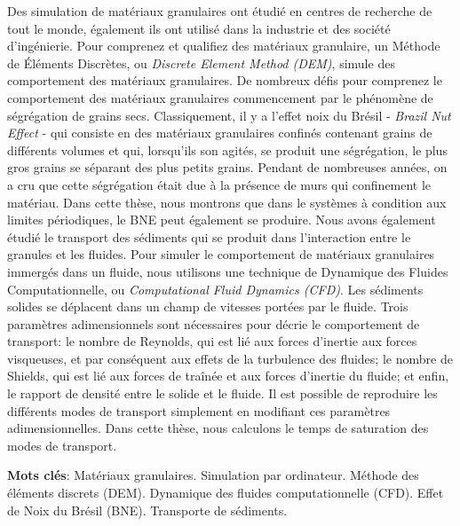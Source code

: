 
\begin{resumo}[Résumé]
    Des simulation de matériaux granulaires ont étudié en centres de recherche de tout le monde, également ils ont utilisé dans la industrie et des société d'ingénierie. Pour comprenez et qualifiez des matériaux granulaire, un Méthode de Éléments Discrètes, ou \textit{Discrete Element Method (DEM)}, simule des comportement des matériaux granulaires.
    De nombreux défis pour comprenez le comportement des matériaux granulaires commencement par le phénomène de ségrégation de grains secs. Classiquement, il y a l'effet noix du Brésil - \textit{Brazil Nut Effect} - qui consiste en des matériaux granulaires confinés contenant grains de différents volumes et qui, lorsqu'ils son agités, se produit une ségrégation, le plus gros grains se séparant des plus petits grains. Pendant de nombreuses années, on a cru que cette ségrégation était due à la présence de murs qui confinement le matériau. Dans cette thèse, nous montrons que dans le systèmes à condition aux limites périodiques, le BNE peut également se produire.
    Nous avons également étudié le transport des sédiments qui se produit dans l'interaction entre le granules et les fluides. Pour simuler le comportement de matériaux granulaires immergés dans un fluide, nous utilisons une technique de Dynamique des Fluides Computationnelle, ou \textit{Computational Fluid Dynamics (CFD)}. Les sédiments solides se déplacent dans un champ de vitesses portées par le fluide. Trois paramètres adimensionnels sont nécessaires pour décrie le comportement de transport: le nombre de Reynolds, qui est lié aux forces d'inertie aux forces visqueuses, et par conséquent aux effets de la turbulence des fluides; le nombre de Shields, qui est lié aux forces de traînée et aux forces d'inertie du fluide; et enfin, le rapport de densité entre le solide et le fluide. Il est possible de reproduire les différents modes de transport simplement en modifiant ces paramètres adimensionnelles. Dans cette thèse, nous calculons le temps de saturation des modes de transport.

    \textbf{Mots clés}: Matériaux granulaires. Simulation par ordinateur. Méthode des éléments discrets (DEM). Dynamique des fluides computationnelle (CFD). Effet de Noix du Brésil (BNE). Transporte de sédiments.


\end{resumo}

